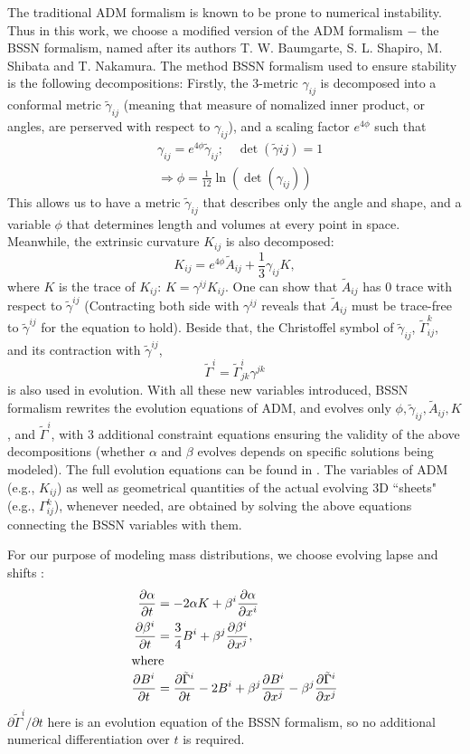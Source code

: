 \documentclass[conference]{IEEEtran}
\begin{document}
The traditional ADM formalism is known to be prone to numerical 
instability. Thus in this work, we choose a modified version of the 
ADM formalism $-$ the BSSN formalism, named after its authors 
T. W. Baumgarte, S. L. Shapiro, M. Shibata and T. Nakamura. 
The method BSSN formalism used to ensure stability is the following decompositions: 
Firstly, the 3-metric $\gamma_{ij}$ is decomposed into a conformal metric $\tilde{\gamma}_{ij}$
(meaning that measure of nomalized inner product, or angles, are perserved with respect to 
$\gamma_{ij}$), and a scaling factor $e^{4\phi}$ such that 
\begin{align*}
& \gamma_{ij} = e^{4\phi} \tilde{\gamma}_{ij}; \quad \det(\tilde{\gamma}{ij}) = 1 \tag{11}\\
& \Rightarrow \phi = \frac{1}{12} \ln\left(\det\left(\gamma_{ij}\right)\right)
\end{align*}
This allows us to have a metric $\tilde{\gamma}_{ij}$ that describes only the angle and shape, 
and a variable $\phi$ that determines length and volumes at every point in space.
Meanwhile, the extrinsic curvature $K_{ij}$ is also decomposed: 
\[
K_{ij} = e^{4\phi}\tilde{A}_{ij} + \frac{1}{3} \gamma_{ij}K,
\]
where $K$ is the trace of $K_{ij}$: $K = \gamma^{ij}K_{ij}$. One can show that $\tilde{A}_{ij}$ has 0 trace with respect to $\tilde{\gamma}^{ij}$ 
(Contracting both side with $\gamma^{ij}$ reveals that $\tilde{A}_{ij}$ 
must be trace-free to $\tilde{\gamma}^{ij}$ for the equation to hold). Beside that, the Christoffel symbol of 
$\tilde\gamma_{ij}$, $\tilde\Gamma^{k}_{ij}$, and its contraction with $\tilde\gamma^{ij}$, 
\[
\tilde\Gamma^{i} = \tilde\Gamma^{i}_{jk}\gamma^{jk}
\]
is also used in evolution. With all these new variables introduced, BSSN formalism rewrites 
the evolution equations of ADM, and evolves only $\phi, \tilde{\gamma}_{ij}, \tilde{A}_{ij}, K$, and 
$\tilde\Gamma^{i}$, with 3 additional constraint equations 
ensuring the validity of the above decompositions (whether $\alpha$ and $\beta$ evolves 
depends on specific solutions being modeled). The full evolution equations can be found in 
\cite{BSSN}\cite{ADM+}\cite{BSSNBH}.
The variables of ADM (e.g., $K_{ij}$) as 
well as geometrical quantities of the actual evolving 3D ``sheets" (e.g., $\Gamma^k_{ij}$), whenever needed, are 
obtained by solving the above equations connecting the BSSN variables with them.

For our purpose of modeling mass distributions, we choose evolving lapse and shifts \cite{cao}:
\begin{align*}
\frac{\partial \alpha}{\partial t}&= -2\alpha K + \beta^i \frac{\partial \alpha}{\partial x^i}\\
\frac{\partial \beta^i}{\partial t}&= \frac{3}{4}B^i + \beta^j \frac{\partial \beta^i}{\partial x^j},\\
\intertext{where}
\frac{\partial B^i}{\partial t}&= \frac{\partial \tilde{\Gamma}^i}{\partial t} - 2B^i + \beta^j\frac{\partial B^i}{\partial x^j} -
\beta^j \frac{\partial \tilde{\Gamma}^i}{\partial x^j}
\end{align*}
$\partial \tilde{\Gamma}^i / \partial t$ here is an evolution equation of the BSSN formalism, so no 
additional numerical differentiation over $t$ is required.
\end{document}
